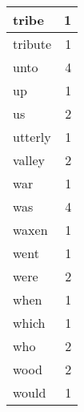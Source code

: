\begin{center}
\begin{longtable}{l|r}
tribe & 1 \\ \hline
tribute & 1 \\ \hline
unto & 4 \\ \hline
up & 1 \\ \hline
us & 2 \\ \hline
utterly & 1 \\ \hline
valley & 2 \\ \hline
war & 1 \\ \hline
was & 4 \\ \hline
waxen & 1 \\ \hline
went & 1 \\ \hline
were & 2 \\ \hline
when & 1 \\ \hline
which & 1 \\ \hline
who & 2 \\ \hline
wood & 2 \\ \hline
would & 1 \\ \hline
\end{longtable}
\end{center}



\normalsize



